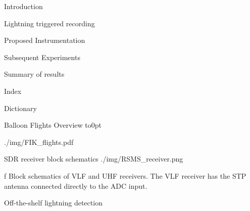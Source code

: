 \chap Introduction



 Lightning triggered recording



\chap[instrumentation] Proposed Instrumentation



\chap[experiments] Subsequent Experiments



\chap[results] Summary of results



\app Index
\makeindex

\app Dictionary
\makeglos

 Balloon Flights Overview
\vbox to0pt{\vskip-25mm\centerline{\inspic ./img/FIK_flights.pdf }\vss}
\nextoddpage

 SDR receiver block schematics
\medskip
\picw=8cm \cinspic ./img/RSMS_receiver.png
\caption/f Block schematics of VLF and UHF receivers. The VLF receiver has the STP antenna connected directly to the ADC input.
\medskip

 Off-the-shelf lightning detection

